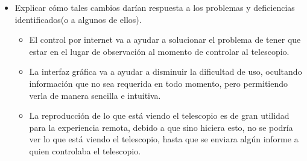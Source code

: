 \documentclass[letterpaper,spanish,10pt]{article}
\begin{document}
\begin{itemize}
\begin{itemize}
\item Ajuste manual del telescopio: El sistema debe permitir controlar el telescopio manualmente para permitir ajustes menores, que ayuden a corregir errores en la direcci\'on que se observa, que pudieran ocurrir por factores externos, como es la deflexi\'on por el peso propio del telescopio en algunas posiciones.

\item Detener de forma inmediata el telescopio en caso de emergencia: El sistema tiene que tener una opci\'on de emergencia para detener el telescopio de forma inmediata para evitar cualquier da\~no que se crea que pueda ocurrir. Por ejemplo, da\~no por alguna variaci\'on en las condiciones clim\'aticas.

\item Controlar acceso a la aplicaci\'on(Sesiones): El sistema debe tener acceso para los distintos usuarios, de manera que cada uno tenga su propia estad\'istica de lo observado.

\item Guardar coordenadas de observaci\'on realizadas: El sistema debe guardar registro de las coordenadas observadas por cada usuario del sistema. De esta forma ayuda a que se puedan repetir observaciones y a realizar estudios sobre \'estas.

\end{itemize}

\newpage

\item Explicar c\'omo tales cambios dar\'ian respuesta a los problemas y deficiencias identificados(o a algunos de ellos).

\begin{itemize}

\item El control por internet va a ayudar a solucionar el problema de tener que estar en el lugar de observaci\'on al momento de controlar al telescopio. 

\item La interfaz gr\'afica va a ayudar a disminuir la dificultad de uso, ocultando informaci\'on que no sea requerida en todo momento, pero permitiendo verla de manera sencilla e intuitiva.

\item La reproducci\'on de lo que est\'a viendo el telescopio es de gran utilidad para la experiencia remota, debido a que sino hiciera esto, no se podr\'ia ver lo que est\'a viendo el telescopio, hasta que se enviara alg\'un informe a quien controlaba el telescopio.


\end{itemize}
\end{itemize}
\end{document}
